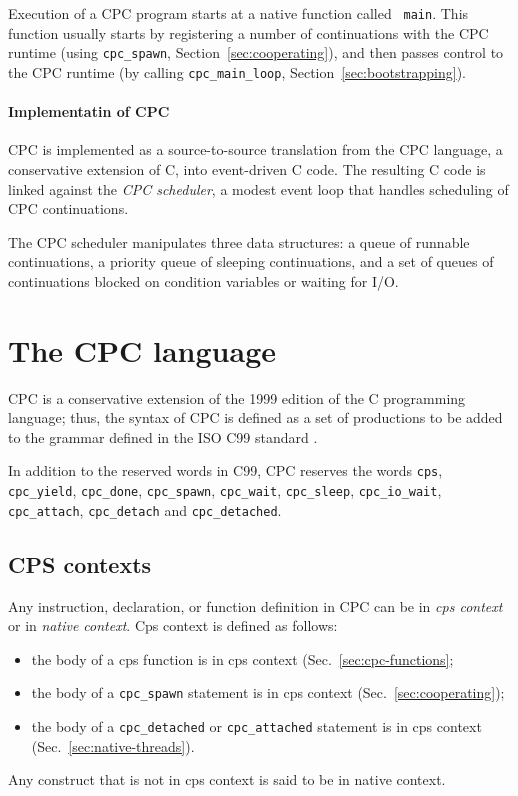\documentclass[a4paper]{report}
\begin{document}
Execution of a CPC program starts at a native function called {\tt
  main}.  This function usually starts by registering a number of
continuations with the CPC runtime (using {\tt cpc\_spawn},
Section~\ref{sec:cooperating}), and then passes control to the CPC
runtime (by calling {\tt cpc\_main\_loop}, Section~\ref{sec:bootstrapping}).

\paragraph{Implementatin of CPC}

CPC is implemented as a source-to-source translation from the CPC
language, a conservative extension of C, into event-driven C code.
The resulting C code is linked against the {\em CPC scheduler}, a
modest event loop that handles scheduling of CPC continuations.

The CPC scheduler manipulates three data structures: a queue of
runnable continuations, a priority queue of sleeping continuations,
and a set of queues of continuations blocked on condition variables or
waiting for I/O.

\section{The CPC language}

CPC is a conservative extension of the 1999 edition of the C
programming language; thus, the syntax of CPC is defined as a set of
productions to be added to the grammar defined in the ISO C99 standard
\cite{iso:c99}.

In addition to the reserved words in C99, CPC reserves the words
{\tt cps}, {\tt cpc\_yield}, {\tt cpc\_done}, {\tt cpc\_spawn}, 
{\tt cpc\_wait}, {\tt cpc\_sleep},
{\tt cpc\_io\_wait}, {\tt cpc\_attach}, {\tt cpc\_detach} and
{\tt cpc\_detached}.

\subsection{CPS contexts} \label{sec:contexts}

Any instruction, declaration, or function definition in CPC can be in
{\em cps context\/} or in {\em native context}.  Cps context is
defined as follows:
\begin{itemize}
\item the body of a cps function is in cps context
  (Sec.~\ref{sec:cpc-functions};
\item the body of a {\tt cpc\_spawn} statement is in cps context
  (Sec.~\ref{sec:cooperating});
\item the body of a {\tt cpc\_detached} or {\tt cpc\_attached} statement is
  in cps context (Sec.~\ref{sec:native-threads}).
\end{itemize}
Any construct that is not in cps context is said to be in native
context.
\end{document}
